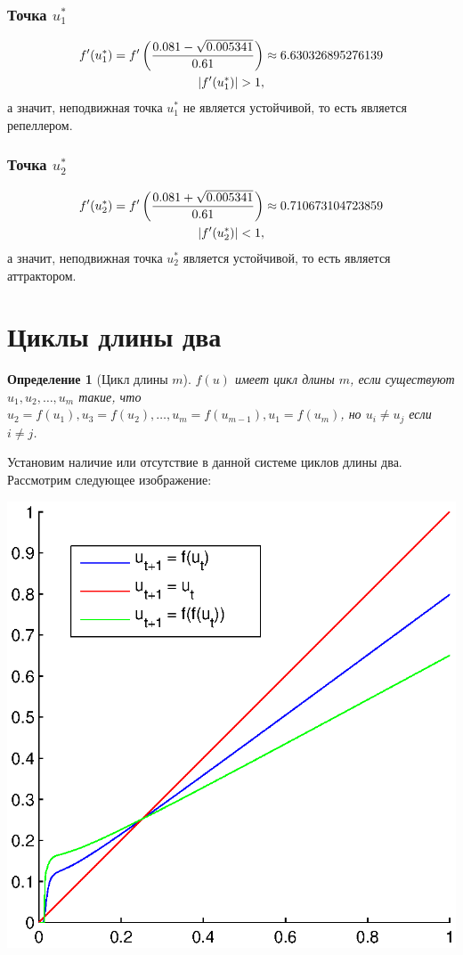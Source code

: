 \documentclass[11pt]{article}
\newtheorem{definition}{Определение}
\newcommand\abs[1]{\left\lvert#1\right\rvert}
\begin{document}
\subsubsection{Точка $u_1^*$}
\begin{gather}
f'(u_1^*) = f'\left(\frac{0.081 - \sqrt{0.005341}}{0.61}\right) \approx 6.630326895276139 \notag \\
\abs{f'(u_1^*)} > 1, \notag
\end{gather}
а значит, неподвижная точка $u_1^*$ не является устойчивой, то есть является репеллером.
\subsubsection{Точка $u_2^*$}
\begin{gather}
f'(u_2^*) = f'\left(\frac{0.081 + \sqrt{0.005341}}{0.61}\right) \approx 0.710673104723859 \notag \\
\abs{f'(u_2^*)} < 1, \notag
\end{gather}
а значит, неподвижная точка $u_2^*$ является устойчивой, то есть является аттрактором.
\section{Циклы длины два}
\begin{definition}[Цикл длины $m$]
$f(u)$ имеет цикл длины $m$, если существуют $u_1, u_2, \ldots, u_m$ такие, что $u_2 = f(u_1), u_3 = f(u_2), \ldots, u_m = f(u_{m-1}), u_1 = f(u_m)$, но $u_i \neq u_j$ если $i \neq j$.
\end{definition}

Установим наличие или отсутствие в данной системе циклов длины два. Рассмотрим следующее изображение:

\includegraphics[scale=1.0]{pics/f_ff.eps}
\end{document}
